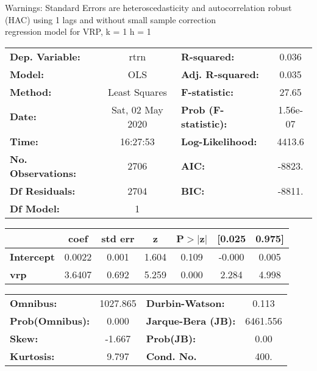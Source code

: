 Warnings: \newline
 [1] Standard Errors are heteroscedasticity and autocorrelation robust (HAC) using 1 lags and without small sample correction\\ 

regression model for VRP, k = 1 h = 1\begin{center}
\begin{tabular}{lclc}
\toprule
\textbf{Dep. Variable:}    &       rtrn       & \textbf{  R-squared:         } &     0.036   \\
\textbf{Model:}            &       OLS        & \textbf{  Adj. R-squared:    } &     0.035   \\
\textbf{Method:}           &  Least Squares   & \textbf{  F-statistic:       } &     27.65   \\
\textbf{Date:}             & Sat, 02 May 2020 & \textbf{  Prob (F-statistic):} &  1.56e-07   \\
\textbf{Time:}             &     16:27:53     & \textbf{  Log-Likelihood:    } &    4413.6   \\
\textbf{No. Observations:} &        2706      & \textbf{  AIC:               } &    -8823.   \\
\textbf{Df Residuals:}     &        2704      & \textbf{  BIC:               } &    -8811.   \\
\textbf{Df Model:}         &           1      & \textbf{                     } &             \\
\bottomrule
\end{tabular}
\begin{tabular}{lcccccc}
                   & \textbf{coef} & \textbf{std err} & \textbf{z} & \textbf{P$> |$z$|$} & \textbf{[0.025} & \textbf{0.975]}  \\
\midrule
\textbf{Intercept} &       0.0022  &        0.001     &     1.604  &         0.109        &       -0.000    &        0.005     \\
\textbf{vrp}       &       3.6407  &        0.692     &     5.259  &         0.000        &        2.284    &        4.998     \\
\bottomrule
\end{tabular}
\begin{tabular}{lclc}
\textbf{Omnibus:}       & 1027.865 & \textbf{  Durbin-Watson:     } &    0.113  \\
\textbf{Prob(Omnibus):} &   0.000  & \textbf{  Jarque-Bera (JB):  } & 6461.556  \\
\textbf{Skew:}          &  -1.667  & \textbf{  Prob(JB):          } &     0.00  \\
\textbf{Kurtosis:}      &   9.797  & \textbf{  Cond. No.          } &     400.  \\
\bottomrule
\end{tabular}
\end{center}

